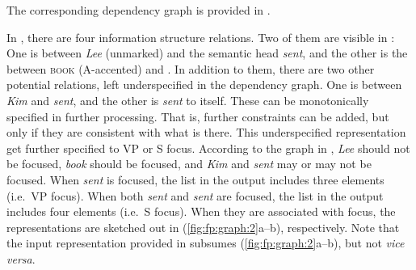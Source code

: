 

\noindent The corresponding dependency graph is provided
in . 




In , there are four information structure
relations. Two of them are visible in : One is
 between \textit{Lee} (unmarked) and the semantic head
\textit{sent}, and the other is the  between
\textsc{book} (A-accented) and . In
addition to them, there are two other potential relations, left
underspecified in the dependency graph.  One is between \textit{Kim}
and \textit{sent}, and the other is \textit{sent} to itself. These can
be monotonically specified in further processing. That is, further
constraints can be added, but only if they are consistent with what is
there. This underspecified  representation get further
specified to VP  or S focus.
According to the graph in , \textit{Lee} should
not be focused, \textit{book} should be focused, and \textit{Kim} and
\textit{sent} may or may not be focused.  When \textit{sent} is
focused, the  list in the output includes three 
elements (i.e.\ VP focus). When both \textit{sent} and \textit{sent}
are focused, the  list in the output includes four
 elements (i.e.\ S focus).  When they are associated with
focus, the representations are sketched out in
(\ref{fig:fp:graph:2}a--b), respectively.  Note that the input
representation provided in  subsumes
(\ref{fig:fp:graph:2}a--b), but not \textit{vice versa}.

